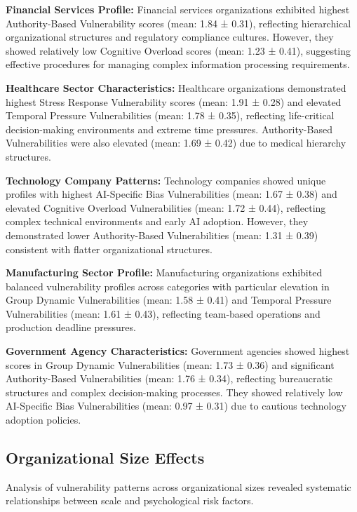 \documentclass[10pt, twocolumn]{article}
\begin{document}
\textbf{Financial Services Profile:} Financial services organizations exhibited highest Authority-Based Vulnerability scores (mean: 1.84 ± 0.31), reflecting hierarchical organizational structures and regulatory compliance cultures. However, they showed relatively low Cognitive Overload scores (mean: 1.23 ± 0.41), suggesting effective procedures for managing complex information processing requirements.

\textbf{Healthcare Sector Characteristics:} Healthcare organizations demonstrated highest Stress Response Vulnerability scores (mean: 1.91 ± 0.28) and elevated Temporal Pressure Vulnerabilities (mean: 1.78 ± 0.35), reflecting life-critical decision-making environments and extreme time pressures. Authority-Based Vulnerabilities were also elevated (mean: 1.69 ± 0.42) due to medical hierarchy structures.

\textbf{Technology Company Patterns:} Technology companies showed unique profiles with highest AI-Specific Bias Vulnerabilities (mean: 1.67 ± 0.38) and elevated Cognitive Overload Vulnerabilities (mean: 1.72 ± 0.44), reflecting complex technical environments and early AI adoption. However, they demonstrated lower Authority-Based Vulnerabilities (mean: 1.31 ± 0.39) consistent with flatter organizational structures.

\textbf{Manufacturing Sector Profile:} Manufacturing organizations exhibited balanced vulnerability profiles across categories with particular elevation in Group Dynamic Vulnerabilities (mean: 1.58 ± 0.41) and Temporal Pressure Vulnerabilities (mean: 1.61 ± 0.43), reflecting team-based operations and production deadline pressures.

\textbf{Government Agency Characteristics:} Government agencies showed highest scores in Group Dynamic Vulnerabilities (mean: 1.73 ± 0.36) and significant Authority-Based Vulnerabilities (mean: 1.76 ± 0.34), reflecting bureaucratic structures and complex decision-making processes. They showed relatively low AI-Specific Bias Vulnerabilities (mean: 0.97 ± 0.31) due to cautious technology adoption policies.

\subsection{Organizational Size Effects}

Analysis of vulnerability patterns across organizational sizes revealed systematic relationships between scale and psychological risk factors.
\end{document}
